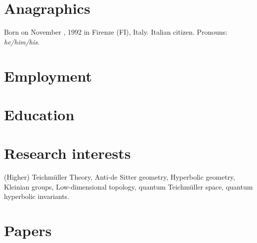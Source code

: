 \documentclass{prometheus_cv}
\begin{document}
\thispagestyle{empty}					%
\pagestyle{fancy}			 		%

\vspace*{-1cm}
\centering 


\vspace*{0.4cm}

\section{Anagraphics}

\raggedright
\begin{normalsize}
	Born on November , 1992 in Firenze (FI), Italy. Italian citizen. Pronouns: \emph{he/him/his}.
\end{normalsize}

\section{Employment}


\section{Education}


\section{Research interests}

\begin{normalsize}
	(Higher) Teichm\"uller Theory, Anti-de Sitter geometry, Hyperbolic geometry, Kleinian groups, Low-dimensional topology, quantum Teichm\"uller space, quantum hyperbolic invariants.
\end{normalsize}


\section{Papers}

\end{document}
